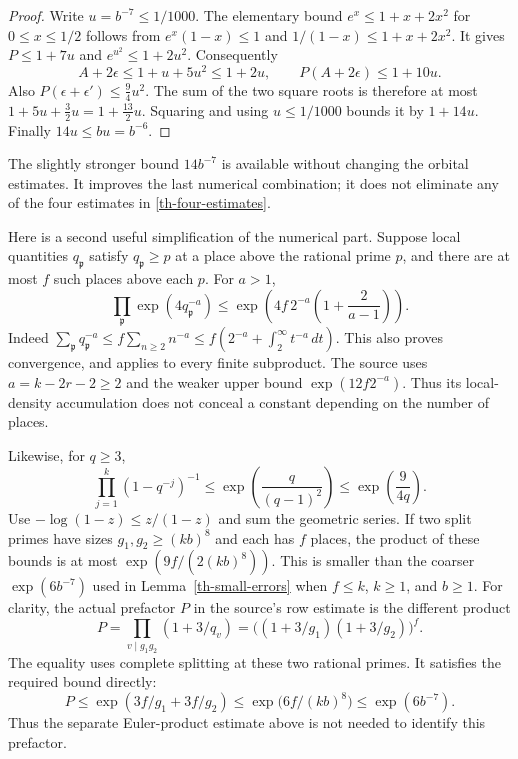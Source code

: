 \begin{proof}
Write $u=b^{-7}\le1/1000$.  The elementary bound
$e^x\le1+x+2x^2$ for $0\le x\le1/2$ follows from
$e^x(1-x)\le1$ and $1/(1-x)\le1+x+2x^2$.
It gives $P\le1+7u$ and $e^{u^2}\le1+2u^2$.
Consequently
\[
 A+2\epsilon\le1+u+5u^2\le1+2u,
 \qquad P(A+2\epsilon)\le1+10u.
\]
Also $P(\epsilon+\epsilon')\le\tfrac94u^2$.
The sum of the two square roots is therefore at most
$1+5u+\tfrac32u=1+\tfrac{13}{2}u$.  Squaring and using
$u\le1/1000$ bounds it by $1+14u$.
Finally $14u\le bu=b^{-6}$.
\end{proof}

The slightly stronger bound $14b^{-7}$ is available without changing
the orbital estimates.  It improves the last numerical combination;
it does not eliminate any of the four estimates in
\eqref{th-four-estimates}.

Here is a second useful simplification of the numerical part.  Suppose
local quantities $q_{\mathfrak p}$ satisfy
$q_{\mathfrak p}\ge p$ at a place above the rational prime $p$, and
there are at most $f$ such places above each $p$.  For $a>1$,
\begin{equation}\label{th-density-bound}
 \prod_{\mathfrak p}\exp(4q_{\mathfrak p}^{-a})
 \le\exp\left(4f\,2^{-a}\left(1+\frac2{a-1}\right)\right).
\end{equation}
Indeed
$\sum_{\mathfrak p}q_{\mathfrak p}^{-a}
\le f\sum_{n\ge2}n^{-a}
\le f(2^{-a}+\int_2^\infty t^{-a}\,dt)$.
This also proves convergence, and applies to every finite subproduct.
The source uses $a=k-2r-2\ge2$ and the weaker upper bound
$\exp(12f2^{-a})$.  Thus its local-density accumulation does not
conceal a constant depending on the number of places.

Likewise, for $q\ge3$,
\[
 \prod_{j=1}^k(1-q^{-j})^{-1}
 \le\exp\left(\frac{q}{(q-1)^2}\right)
 \le\exp\left(\frac9{4q}\right).
\]
Use $-\log(1-z)\le z/(1-z)$ and sum the geometric series.
If two split primes have sizes $g_1,g_2\ge(kb)^8$ and each has $f$
places, the product of these bounds is at most
$\exp(9f/(2(kb)^8))$.  This is smaller than the coarser
$\exp(6b^{-7})$ used in Lemma~\ref{th-small-errors} when
$f\le k$, $k\ge1$, and $b\ge1$.
For clarity, the actual prefactor $P$ in the source's row estimate
is the different product
\[
 P=\prod_{v\mid g_1g_2}(1+3/q_v)
   =\bigl((1+3/g_1)(1+3/g_2)\bigr)^f.
\]
The equality uses complete splitting at these two rational primes.
It satisfies the required bound directly:
\[
 P\le\exp(3f/g_1+3f/g_2)
   \le\exp\bigl(6f/(kb)^8\bigr)
   \le\exp(6b^{-7}).
\]
Thus the separate Euler-product estimate above is not needed to
identify this prefactor.

